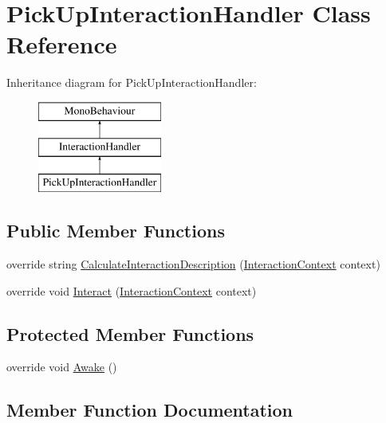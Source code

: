 \hypertarget{class_pick_up_interaction_handler}{}\section{Pick\+Up\+Interaction\+Handler Class Reference}
\label{class_pick_up_interaction_handler}
Inheritance diagram for Pick\+Up\+Interaction\+Handler\+:\begin{figure}[H]
\begin{center}
\leavevmode
\includegraphics[height=3.000000cm]{class_pick_up_interaction_handler}
\end{center}
\end{figure}
\subsection*{Public Member Functions}
\begin{DoxyCompactItemize}
\item 
override string \mbox{\hyperlink{class_pick_up_interaction_handler_ab989c9d6c0e2f7849c7c6cbf7b0827fd}{Calculate\+Interaction\+Description}} (\mbox{\hyperlink{class_interaction_context}{Interaction\+Context}} context)
\item 
override void \mbox{\hyperlink{class_pick_up_interaction_handler_a4f55440deca34467164222fbbed1c409}{Interact}} (\mbox{\hyperlink{class_interaction_context}{Interaction\+Context}} context)
\end{DoxyCompactItemize}
\subsection*{Protected Member Functions}
\begin{DoxyCompactItemize}
\item 
override void \mbox{\hyperlink{class_pick_up_interaction_handler_a679468740f0c76cf96acef5315bccb6d}{Awake}} ()
\end{DoxyCompactItemize}


\subsection{Member Function Documentation}
\mbox{\label{class_pick_up_interaction_handler_a679468740f0c76cf96acef5315bccb6d}} 
